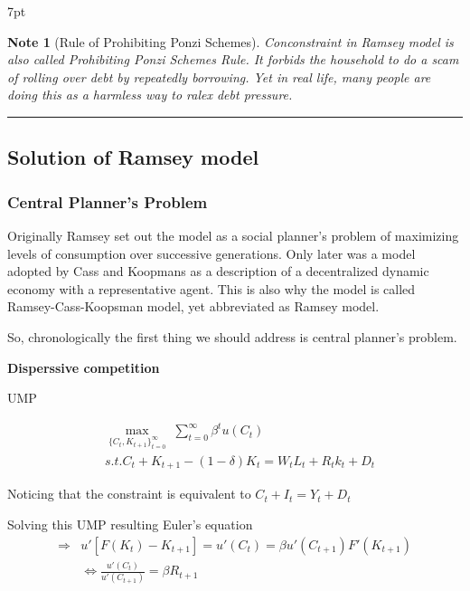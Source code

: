 \documentclass{article}
\newcommand*\sepline{%
  \begin{center}
    \rule[1ex]{.5\textwidth}{.5pt}
  \end{center}}
\newenvironment{blueblock}{
\def\FrameCommand{
  \hspace{1pt}
    {\color{DarkBlue}
    \vrule width 2pt}
    {\color{blueshade}
    \vrule width 4pt}
  \colorbox{blueshade}
}
\MakeFramed{
  \advance
  \hsize-
  \width
  \FrameRestore}
\noindent\hspace{-4.55pt}%
\begin{adjustwidth}{}{7pt}
\vspace{2pt}\vspace{2pt}
}
{\vspace{2pt}\end{adjustwidth}\endMakeFramed}
\newtheorem{note}{Note}
\begin{document}
\begin{blueblock}
\begin{note}[Rule of Prohibiting Ponzi Schemes]
Conconstraint in Ramsey model is also called Prohibiting Ponzi Schemes Rule. It forbids the household to do a scam of rolling over debt by repeatedly borrowing. Yet in real life, many people are doing this as a harmless way to ralex debt pressure.
\end{note}
\end{blueblock}

\sepline
\subsection{Solution of Ramsey model}

\subsubsection{Central Planner's
Problem}\label{central-planners-problem}

Originally Ramsey set out the model as a social planner's problem of
maximizing levels of consumption over successive generations. Only later was a model adopted by Cass and Koopmans as a description of a
decentralized dynamic economy with a representative agent. This is also why the model is called Ramsey-Cass-Koopsman model, yet abbreviated as Ramsey model.

So, chronologically the first thing we should address is central
planner's problem.

\textbf{Disperssive competition} 

UMP

\begin{equation}
\begin{split}
  &\max_{\{C_{t},K_{t+1}\}_{t=0}^{\infty}} \; \sum\limits_{t=0}^{\infty} \beta^{t}u(C_{t})
  \\& s.t.  C_{t}+K_{t+1}-(1-\delta)K_{t}=W_t L_{t}+R_t k_{t}+D_{t}
\end{split}
\end{equation}

Noticing that the constraint is equivalent to $C_{t}+I_{t}=Y_{t}+D_{t}$

Solving this UMP resulting Euler's equation 
\begin{equation}
\begin{split}
  \Rightarrow & u'[F(K_{t})-K_{t+1}]=u'(C_{t})=\beta u'(C_{t+1})F'(K_{t+1})\\
  &\iff \frac{u'(C_{t})}{u'(C_{t+1})}=\beta R_{t+1}
\end{split}
\end{equation}
\end{document}
